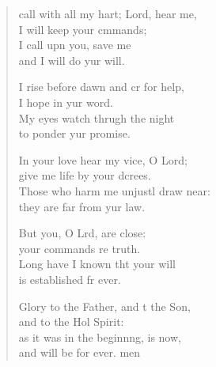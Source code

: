 \begin{verse}
  \begin{patverse}
     call with all my hart; Lord, hear me,\Med\\
I will keep your cmmands;\\
I call upn you, save me\Med\\
and I will do yur will.

I rise before dawn and cr for help,\Med\\
I hope in yur word.\\
My eyes watch thrugh the night\Med\\
to ponder yur promise.

In your love hear my vice, O Lord;\Med\\
give me life by your dcrees.\\
Those who harm me unjustl draw near:\Med\\
they are far from yur law.

But you, O Lrd, are close:\Med\\
your commands re truth.\\
Long have I known tht your will\Med\\
is established fr ever.

Glory to the Father, and t the Son,\Med\\
and to the Hol Spirit:\\
as it was in the beginn\pointup{\i}ng, is now,\Med\\
and will be for ever. men
  \end{patverse}
\end{verse}
